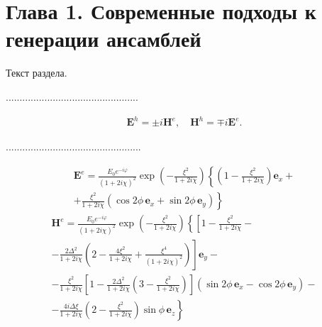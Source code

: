 \section{Глава 1. Современные подходы к генерации ансамблей}

Текст раздела.

................................................

\begin{equation}
 \begin{aligned}
  \mathbf E^h=\pm i\mathbf H^e,\quad\mathbf H^h=\mp i\mathbf E^e. %
 \end{aligned}
\end{equation}

.................................................

\begin{equation}            %
 \label{Eeexplicit}         %
 \begin{aligned}            %
  \mathbf E^e=\frac{E_0e^{-i\varphi}}{(1+2i\chi)^2}\exp\left(-\frac{\xi^2}      %
  {1+2i\chi}\right)\left\{\left(1-\frac{\xi^2}{1+2i\chi}\right)\mathbf          %
  e_x+\right.\\
  \left.+\frac{\xi^2}{1+2i\chi}(\cos2\phi\,\mathbf e_x+\sin2\phi\,\mathbf e_y)\right\}
 \end{aligned}
\end{equation}
\begin{equation}
 \label{Heexplicit}
 \begin{aligned}
  \mathbf H^e=\frac{E_0e^{-i\varphi}}{(1+2i\chi)^2}\exp\left(-\frac{\xi^2}
  {1+2i\chi}\right)\left\{\left[1-\frac{\xi^2}{1+2i\chi}-\right.\right.\\
  \left.-\frac{2\Delta^2}{1+2i\chi}\left(2-\frac{4\xi^2}
  {1+2i\chi}+\frac{\xi^4}{(1+2i\chi)^2}\right)\right]\mathbf e_y-\\
  -\frac{\xi^2}{1+2i\chi}\left[1-\frac{2\Delta^2}{1+2i\chi}\left(3-\frac{\xi^2}{1+2i\chi}\right)\right]
  (\sin2\phi\,\mathbf e_x-\cos2\phi\,\mathbf e_y)-\\
  \left.-\frac{4i\Delta\xi}{1+2i\chi}
  \left(2-\frac{\xi^2}{1+2i\chi}\right)\sin\phi\,\mathbf e_z\right\}
 \end{aligned}
\end{equation}

